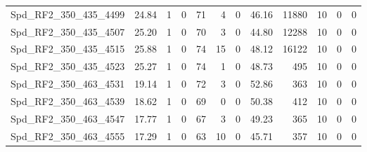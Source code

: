 \begin{longtable}[c]{@{}lrrrrrrrrrrr@{}}
Spd\_RF2\_350\_435\_4499     & 24.84                  & 1                       & 0                       & 71                     & 4                       & 0                       & 46.16                   & 11880                    & 10                       & 0                        & 0                        \\
Spd\_RF2\_350\_435\_4507     & 25.20                  & 1                       & 0                       & 70                     & 3                       & 0                       & 44.80                   & 12288                    & 10                       & 0                        & 0                        \\
Spd\_RF2\_350\_435\_4515     & 25.88                  & 1                       & 0                       & 74                     & 15                      & 0                       & 48.12                   & 16122                    & 10                       & 0                        & 0                        \\
Spd\_RF2\_350\_435\_4523     & 25.27                  & 1                       & 0                       & 74                     & 1                       & 0                       & 48.73                   & 495                      & 10                       & 0                        & 0                        \\
Spd\_RF2\_350\_463\_4531     & 19.14                  & 1                       & 0                       & 72                     & 3                       & 0                       & 52.86                   & 363                      & 10                       & 0                        & 0                        \\
Spd\_RF2\_350\_463\_4539     & 18.62                  & 1                       & 0                       & 69                     & 0                       & 0                       & 50.38                   & 412                      & 10                       & 0                        & 0                        \\
Spd\_RF2\_350\_463\_4547     & 17.77                  & 1                       & 0                       & 67                     & 3                       & 0                       & 49.23                   & 365                      & 10                       & 0                        & 0                        \\
Spd\_RF2\_350\_463\_4555     & 17.29                  & 1                       & 0                       & 63                     & 10                      & 0                       & 45.71                   & 357                      & 10                       & 0                        & 0                        \\

\end{longtable}

